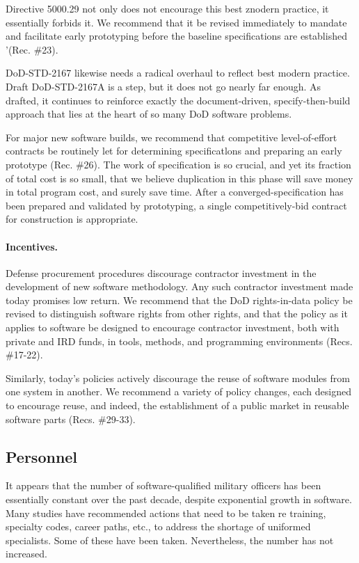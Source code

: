 \documentclass[12pt]{article}
\begin{document}
Directive 5000.29 not only does not encourage this best znodern practice, it essentially
forbids it. We recommend that it be revised immediately to mandate and facilitate early
prototyping before the baseline specifications are established '(Rec. \#23).

DoD-STD-2167 likewise needs a radical overhaul to reflect best modern practice. Draft
DoD-STD-2167A is a step, but it does not go nearly far enough. As drafted, it continues to
reinforce exactly the document-driven, specify-then-build approach that lies at the heart
of so many DoD software problems.

For major new software builds, we recommend that competitive level-of-effort contracts
be routinely let for determining specificatlons and preparing an early prototype (Rec. \#26).
The work of specification is so crucial, and yet its fraction of total cost is so small, that
we believe duplication in this phase will save money in total program cost, and surely save
time. After a converged-specification has been prepared and validated by prototyping, a
single competitively-bid contract for construction is appropriate.

\paragraph{Incentives.} Defense procurement procedures discourage contractor investment in the
development of new software methodology. Any such contractor investment made today
promises low return. We recommend that the DoD rights-in-data policy be revised to
distinguish software rights from other rights, and that the policy as it applies to software
be designed to encourage contractor investment, both with private and IRD funds, in tools,
methods, and programming environments (Recs. \#17-22).

Similarly, today's policies actively discourage the reuse of software modules from
one system in another. We recommend a variety of policy changes, each designed to
encourage reuse, and indeed, the establishment of a public market in reusable software
parts (Recs. \#29-33).

\subsection*{Personnel}

It appears that the number of software-qualified military officers has been
essentially constant over the past decade, despite exponential growth in
software. Many studies have recommended actions that need to be taken re
training, specialty codes, career paths, etc., to address the shortage of
uniformed specialists. Some of these have been taken.  Nevertheless, the
number has not increased.
\end{document}
